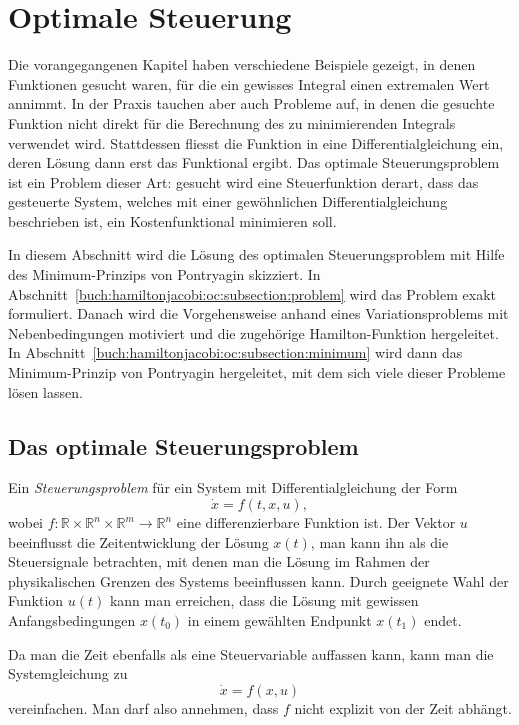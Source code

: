 %
%
%
\section{Optimale Steuerung
\label{buch:hamiltonjacobi:section:oc}}
Die vorangegangenen Kapitel haben verschiedene Beispiele gezeigt,
in denen Funktionen gesucht waren, für die ein gewisses Integral
einen extremalen Wert annimmt.
In der Praxis tauchen aber auch Probleme auf, in denen die
gesuchte Funktion nicht direkt für die Berechnung des zu minimierenden
Integrals verwendet wird.
Stattdessen fliesst die Funktion in eine Differentialgleichung
ein, deren Lösung dann erst das Funktional ergibt.
Das optimale Steuerungsproblem ist ein Problem dieser Art: gesucht
wird eine Steuerfunktion derart, dass das gesteuerte System, welches
mit einer gewöhnlichen Differentialgleichung beschrieben ist, ein
Kostenfunktional minimieren soll.

In diesem Abschnitt wird die Lösung des optimalen Steuerungsproblem
mit Hilfe des Minimum-Prinzips von Pontryagin skizziert.
In Abschnitt~\ref{buch:hamiltonjacobi:oc:subsection:problem}
wird das Problem exakt formuliert.
Danach wird die Vorgehensweise anhand eines Variationsproblems
mit Nebenbedingungen motiviert und die zugehörige Hamilton-Funktion
hergeleitet.
In Abschnitt~\ref{buch:hamiltonjacobi:oc:subsection:minimum}
wird dann das Minimum-Prinzip von Pontryagin hergeleitet, mit dem
sich viele dieser Probleme lösen lassen.

%
%
\subsection{Das optimale Steuerungsproblem
\label{buch:hamiltonjacobi:oc:subsection:problem}}
Ein {\em Steuerungsproblem} für ein System mit Differentialgleichung
%
der Form
\[
\dot{x}
=
f(t, x, u),
\]
wobei $f\colon\mathbb{R}\times \mathbb{R}^n\times\mathbb{R}^m\to\mathbb{R}^n$
eine differenzierbare Funktion ist.
Der Vektor $u$ beeinflusst die Zeitentwicklung der Lösung $x(t)$, man
kann ihn als die Steuersignale betrachten, mit denen man die Lösung
im Rahmen der physikalischen Grenzen des Systems beeinflussen kann.
Durch geeignete Wahl der Funktion $u(t)$ kann man erreichen, dass 
die Lösung mit gewissen Anfangsbedingungen $x(t_0)$ in einem
gewählten Endpunkt $x(t_1)$ endet.

Da man die Zeit ebenfalls als eine Steuervariable auffassen kann, 
kann man die Systemgleichung zu
\begin{equation*}
\dot{x}
=
f(x,u)
\end{equation*}
vereinfachen.
Man darf also annehmen, dass $f$ nicht explizit von der Zeit
abhängt.

